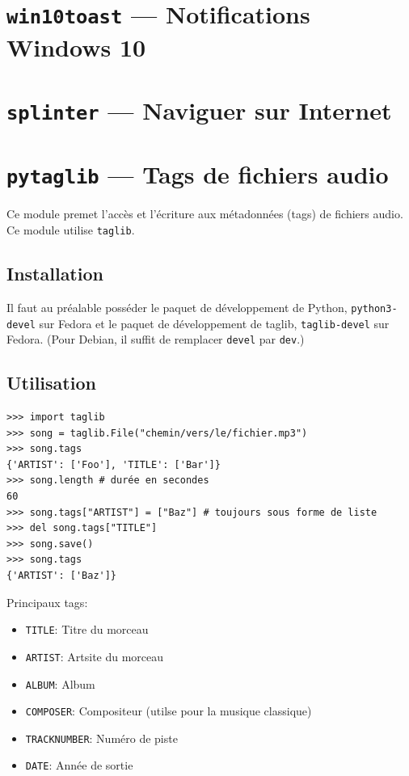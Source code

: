 \documentclass[a4paper, 10pt]{article}
\begin{document}
\section{\texttt{win10toast} --- Notifications Windows 10}
\section{\texttt{splinter} --- Naviguer sur Internet}


\section{\texttt{pytaglib} --- Tags de fichiers audio}
Ce module premet l'accès et l'écriture aux métadonnées (tags) de fichiers audio. Ce module utilise \texttt{taglib}.

\subsection{Installation}
Il faut au préalable posséder le paquet de développement de Python, \texttt{python3-devel} sur Fedora et le paquet de développement de taglib, \texttt{taglib-devel} sur Fedora. (Pour Debian, il suffit de remplacer \texttt{devel} par \texttt{dev}.)

\subsection{Utilisation}
\begin{verbatim}
>>> import taglib
>>> song = taglib.File("chemin/vers/le/fichier.mp3")
>>> song.tags
{'ARTIST': ['Foo'], 'TITLE': ['Bar']}
>>> song.length # durée en secondes
60
>>> song.tags["ARTIST"] = ["Baz"] # toujours sous forme de liste
>>> del song.tags["TITLE"]
>>> song.save()
>>> song.tags
{'ARTIST': ['Baz']}
\end{verbatim}

Principaux tags:
\begin{itemize}
	\item \texttt{TITLE}: Titre du morceau
	\item \texttt{ARTIST}: Artsite du morceau
	\item \texttt{ALBUM}: Album
	\item \texttt{COMPOSER}: Compositeur (utilse pour la musique classique)
	\item \texttt{TRACKNUMBER}: Numéro de piste
	\item \texttt{DATE}: Année de sortie
\end{itemize}
\end{document}
